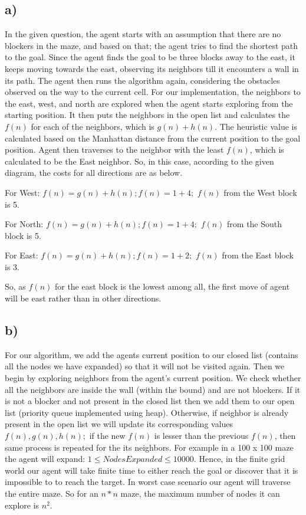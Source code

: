 \documentclass{article}
\begin{document}
\subsection*{a)}  
In the given question, the agent starts with an assumption that there are no blockers in the maze, and based on that; the agent tries to find the shortest path to the goal. Since the agent finds the goal to be three blocks away to the east, it keeps moving towards the east, observing its neighbors till it encounters a wall in its path. The agent then runs the algorithm again, considering the obstacles observed on the way to the current cell. 
For our implementation, the neighbors to the east, west, and north are explored when the agent starts exploring from the starting position. It then puts the neighbors in the open list and calculates the $f(n)$ for each of the neighbors, which is $g(n) + h(n)$. The heuristic value is calculated based on the Manhattan distance from the current position to the goal position. 
Agent then traverses to the neighbor with the least $f(n)$, which is calculated to be the East neighbor.
So, in this case, according to the given diagram, the costs for all directions are as below.

For West: 
$f(n) = g(n) + h(n);
f(n) = 1 + 4;$
$f(n)$ from the West block is 5.

For North:
$f(n) = g(n) + h(n);
f(n) = 1 + 4;$
$f(n)$ from the South block is 5.

For East:
$f(n) = g(n) + h(n);
f(n) = 1 + 2;$
$f(n)$ from the East block is 3.

So, as $f(n)$ for the east block is the lowest among all, the first move of agent will be east rather than in other directions.

\subsection*{b)}
For our algorithm, we add the agents current position to our closed list (contains all the nodes we have expanded) so that it will not be visited again. Then we begin by exploring neighbors from the agent's current position. We check whether all the neighbors are inside the wall (within the bound) and are not blockers. If it is not a blocker and not present in the closed list then we add them to our open list (priority queue implemented using heap). Otherwise, if neighbor is already present in the open list we will update its corresponding values $f(n), g(n), h(n);$ if the new $f(n)$ is lesser than the previous $f(n)$, then same process is repeated for the its neighbors.
For example in a 100 x 100 maze the agent will expand:
$1 \le Nodes Expanded \le 10000$.
Hence, in the finite grid world our agent will take finite time to either reach the goal or discover that it is impossible to to reach the target. In worst case scenario our agent will traverse the entire maze. So for an $n*n$ maze, the maximum number of nodes it can explore is $n^2$.
\end{document}

